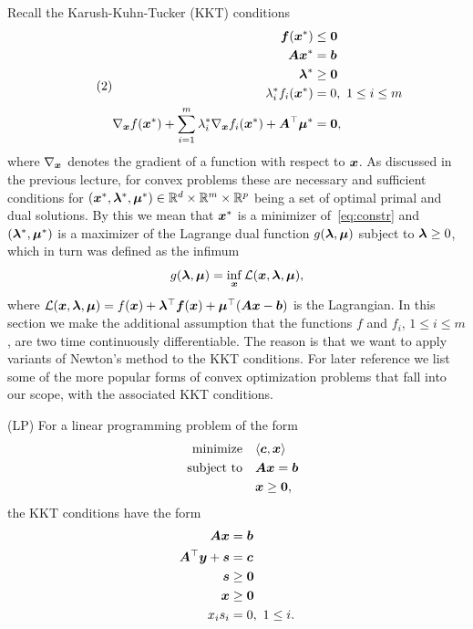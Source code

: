 Recall the Karush-Kuhn-Tucker (KKT) conditions
\begin{align}\label{eq:kkt}\tag{2}
\begin{split}
  \bm{f}(\bm{x}^*) & \leq \bm{0}\\
  \bm{A}\bm{x}^* & = \bm{b}\\
  \bm{\lambda}^*&\geq \bm{0}\\
  \lambda_i^*f_i(\bm{x}^*) & =0, \ 1\leq i\leq m\\
  \nabla_{\bm{x}} f(\bm{x}^*)+\sum_{i=1}^m \lambda_i^* \nabla_{\bm{x}}f_i(\bm{x}^*)+\bm{A}^{\top}\bm{\mu}^* &= \bm{0},
 \end{split}
 \end{align}
where $\nabla_{\bm{x}}$ denotes the gradient of a function with respect to $\bm{x}$.
 As discussed in the previous lecture, for convex problems these are necessary and sufficient conditions for $(\bm{x}^*,\bm{\lambda}^*,\bm{\mu}^*)\in \mathbb{R}^{d}\times \mathbb{R}^m\times \mathbb{R}^p$ being a set of optimal primal and dual solutions. By this we mean that $\bm{x}^*$ is a minimizer of~\eqref{eq:constr} and $(\bm{\lambda}^*,\bm{\mu}^*)$ is a maximizer of the Lagrange dual function $g(\bm{\lambda},\bm{\mu})$ subject to $\bm{\lambda}\geq 0$, which in turn was defined as the infimum
 \begin{equation*}
  g(\bm{\lambda},\bm{\mu}) = \inf_{\bm{x}} \mathcal{L}(\bm{x},\bm{\lambda},\bm{\mu}),
 \end{equation*}
where $\mathcal{L}(\bm{x},\bm{\lambda},\bm{\mu})=f(\bm{x})+\bm{\lambda}^{\top}\bm{f}(\bm{x})+\bm{\mu}^{\top}(\bm{A}\bm{x}-\bm{b})$ is the Lagrangian. In this section we make the additional assumption that the functions $f$ and $f_i$, $1\leq i\leq m$, are two time continuously differentiable. The reason is that we want to apply variants of Newton's method to the KKT conditions.
For later reference we list some of the more popular forms of convex optimization problems that fall into our scope, with the associated KKT conditions.

\begin{example}(LP) For a linear programming problem of the form
\begin{align*}
\text{minimize}\quad & \langle {\bm{c}}, {\bm{x}} \rangle\\
\quad\text{subject to}\quad & \bm{A}\bm{x}=\bm{b}\\
& \bm{x}\geq \bm{0},
\end{align*}
the KKT conditions have the form
\begin{align*}
 \bm{A}\bm{x}&=\bm{b}\\
 \bm{A}^{\top}\bm{y}+\bm{s}&=\bm{c}\\
 \bm{s} & \geq \bm{0}\\
 \bm{x} & \geq \bm{0}\\
 x_is_i&=0, \ 1\leq i.
\end{align*}
\end{example}


